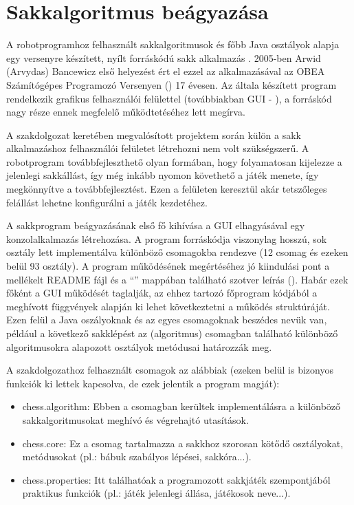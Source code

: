 \documentclass[../documentation.tex]{subfiles}
\begin{document}
\section{Sakkalgoritmus beágyazása}
A robotprogramhoz felhasznált sakkalgoritmusok és főbb Java osztályok alapja egy versenyre készített, nyílt forráskódú sakk alkalmazás \cite{chessgui}. 2005-ben Arwid (Arvydas) Bancewicz első helyezést ért el ezzel az alkalmazásával az OBEA Számítógépes Programozó Versenyen () 17 évesen. Az általa készített program rendelkezik grafikus felhasználói felülettel (továbbiakban GUI - ), a forráskód nagy része ennek megfelelő működtetéséhez lett megírva.

A szakdolgozat keretében megvalósított projektem során külön a sakk alkalmazáshoz felhasználói felületet létrehozni nem volt szükségszerű. A robotprogram továbbfejleszthető olyan formában, hogy folyamatosan kijelezze a jelenlegi sakkállást, így még inkább nyomon követhető a játék menete, így megkönnyítve a továbbfejlesztést. Ezen a felületen keresztül akár tetszőleges felállást lehetne konfigurálni a játék kezdetéhez.

A sakkprogram beágyazásának első fő kihívása a GUI elhagyásával egy konzolalkalmazás létrehozása. A program forráskódja viszonylag hosszú, sok osztály lett implementálva különböző csomagokba rendezve (12 csomag és ezeken belül 93 osztály). A program működésének megértéséhez jó kiindulási pont a mellékelt README fájl és a ``'' mappában található szotver leírás ()\cite{chessgui}. Habár ezek főként a GUI működését taglalják, az ehhez tartozó főprogram kódjából a meghívott függvények alapján ki lehet következtetni a működés struktúráját. Ezen felül a Java oszályoknak és az egyes csomagoknak beszédes nevük van, például a következő sakklépést az  (algoritmus) csomagban található különböző algoritmusokra alapozott osztályok metódusai határozzák meg.

A szakdolgozathoz felhasznált csomagok az alábbiak (ezeken belül is bizonyos funkciók ki lettek kapcsolva, de ezek jelentik a program magját):
\begin{itemize}
	\item chess.algorithm: Ebben a csomagban kerültek implementálásra a különböző sakkalgoritmusokat meghívó és végrehajtó utasítások.
	\item chess.core: Ez a csomag tartalmazza a sakkhoz szorosan kötődő osztályokat, metódusokat (pl.: bábuk szabályos lépései, sakkóra...).
	\item chess.properties: Itt találhatóak a programozott sakkjáték szempontjából praktikus funkciók (pl.: játék jelenlegi állása, játékosok neve...).
\end{itemize}
\end{document}
